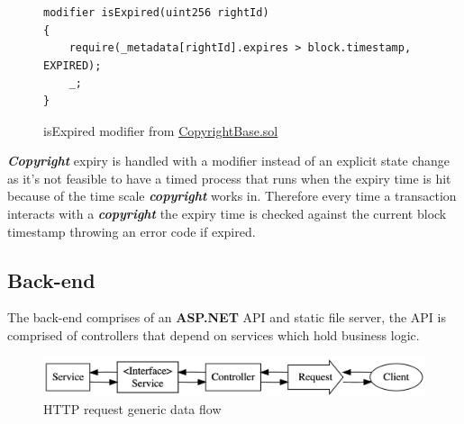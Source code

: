 \documentclass[12pt]{article}
\newcommand{\keyword}[1]{\textbf{\textit{#1}}}
\begin{document}
\begin{figure}[H]
\caption{isExpired modifier from \href{https://github.com/MrHarrisonBarker/CRPL/blob/main/CRPL.Contracts/contracts/Copyrights/CopyrightBase.sol}{CopyrightBase.sol}}
\centering
\begin{lstlisting}[language=Solidity]
modifier isExpired(uint256 rightId)
{
	require(_metadata[rightId].expires > block.timestamp, EXPIRED);
	_;
}
\end{lstlisting}
\end{figure}

\keyword{Copyright} expiry is handled with a modifier instead of an explicit state change as it's not feasible to have a timed process that runs when the expiry time is hit because of the time scale \keyword{copyright} works in. Therefore every time a transaction interacts with a \keyword{copyright} the expiry time is checked against the current block timestamp throwing an error code if expired.

\subsection{Back-end}

The back-end comprises of an \textbf{ASP.NET} API and static file server, the API is comprised of controllers that depend on services which hold business logic.

\begin{figure}[H]
\caption{HTTP request generic data flow}
\centering
\includegraphics[width=\textwidth,height=\textheight,keepaspectratio]{images/patterns/service-controller}
\end{figure}
\end{document}
